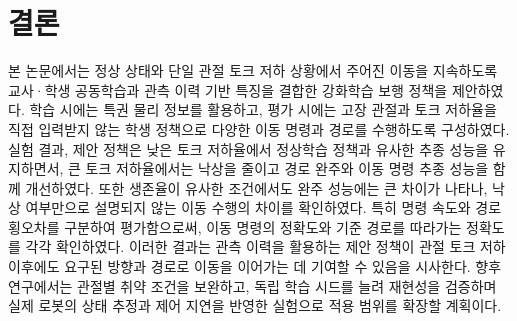 \section{결론}
본 논문에서는 정상 상태와 단일 관절 토크 저하 상황에서 주어진 이동을 지속하도록 교사·학생 공동학습과 관측 이력 기반 특징을 결합한 강화학습 보행 정책을 제안하였다. 학습 시에는 특권 물리 정보를 활용하고, 평가 시에는 고장 관절과 토크 저하율을 직접 입력받지 않는 학생 정책으로 다양한 이동 명령과 경로를 수행하도록 구성하였다. 실험 결과, 제안 정책은 낮은 토크 저하율에서 정상학습 정책과 유사한 추종 성능을 유지하면서, 큰 토크 저하율에서는 낙상을 줄이고 경로 완주와 이동 명령 추종 성능을 함께 개선하였다. 또한 생존율이 유사한 조건에서도 완주 성능에는 큰 차이가 나타나, 낙상 여부만으로 설명되지 않는 이동 수행의 차이를 확인하였다. 특히 명령 속도와 경로 횡오차를 구분하여 평가함으로써, 이동 명령의 정확도와 기준 경로를 따라가는 정확도를 각각 확인하였다. 이러한 결과는 관측 이력을 활용하는 제안 정책이 관절 토크 저하 이후에도 요구된 방향과 경로로 이동을 이어가는 데 기여할 수 있음을 시사한다. 향후 연구에서는 관절별 취약 조건을 보완하고, 독립 학습 시드를 늘려 재현성을 검증하며 실제 로봇의 상태 추정과 제어 지연을 반영한 실험으로 적용 범위를 확장할 계획이다.



